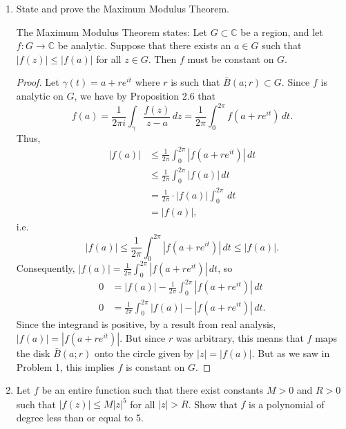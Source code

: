 \documentclass[11pt,oneside,english]{amsart}
\theoremstyle{definition}
\newcommand{\MB}[1]{\mathbb{#1}}
\begin{document}
\begin{enumerate}[leftmargin=*]
\vfill
\pagebreak

\item State and prove the Maximum Modulus Theorem.

The Maximum Modulus Theorem states: Let $G\subset \MB{C}$ be a region, and let $f:G\to \MB{C}$ be analytic. Suppose that there exists an $a\in G$ such that $|f(z)|\leq |f(a)|$ for all $z\in G$. Then $f$ must be constant on $G$.

\begin{proof}
Let $\gamma(t)=a+re^{it}$ where $r$ is such that $\bar B(a;r)\subset G$. Since $f$ is analytic on $G$, we have by Proposition 2.6 that
\[
f(a)=\frac{1}{2\pi i}\int_\gamma \frac{f(z)}{z-a}\,dz=\frac{1}{2\pi}\int_0^{2\pi}f(a+re^{it})\,dt.
\]
Thus, 
\begin{align*}
|f(a)|&\leq \frac{1}{2\pi}\int_0^{2\pi}|f(a+re^{it})|\,dt\\[2mm]
&\leq \frac{1}{2\pi}\int_0^{2\pi}|f(a)|\,dt\\[2mm]
&=\frac{1}{2\pi}\cdot|f(a)|\int_0^{2\pi}\,dt\\[2mm]
&=|f(a)|,
\end{align*}
i.e.
\[
|f(a)|\leq \frac{1}{2\pi}\int_0^{2\pi}|f(a+re^{it})|\,dt\leq |f(a)|.
\]
Consequently, $\displaystyle |f(a)|= \frac{1}{2\pi}\int_0^{2\pi}|f(a+re^{it})|\,dt$, so
\begin{align*}
0&=|f(a)|-\frac{1}{2\pi}\int_0^{2\pi}|f(a+re^{it})|\,dt\\[2mm]
0&=\frac{1}{2\pi}\int_0^{2\pi}|f(a)|-|f(a+re^{it})|\,dt.
\end{align*}
Since the integrand is positive, by a result from real analysis, $|f(a)|=|f(a+re^{it})|$. But since $r$ was arbitrary, this means that $f$ maps the disk $\bar B(a;r)$ onto the circle given by $|z|=|f(a)|$. But as we saw in Problem 1, this implies $f$ is constant on $G$.
\end{proof}

\vfill
\pagebreak

\item Let $f$ be an entire function such that there exist constants $M>0$ and $R>0$ such that $|f(z)|\leq M|z|^5$ for all $|z|>R$. Show that $f$ is a polynomial of degree less than or equal to 5.


\end{enumerate}
\end{document}

